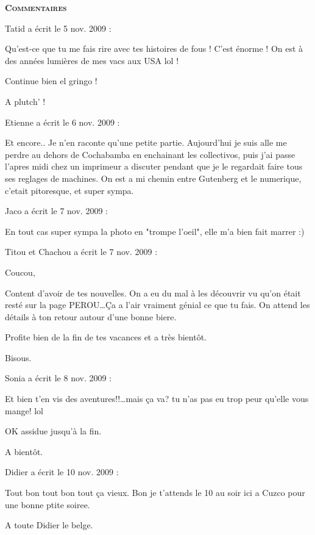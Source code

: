 \bigskip
\textbf{\textsc{Commentaires}}

\medskip
Tatid a écrit le 5 nov. 2009 :
\begin{displayquote}
Qu'est-ce que tu me fais rire avec tes histoires de fous ! C'est énorme ! On est à des années lumières de mes vacs aux USA lol !

Continue bien el gringo !

A plutch' !
\end{displayquote}

\medskip
Etienne a écrit le 6 nov. 2009 :
\begin{displayquote}
Et encore.. Je n'en raconte qu'une petite partie. Aujourd'hui je suis alle me perdre au dehors de Cochabamba en enchainant les collectivos, puis j'ai passe l'apres midi chez un imprimeur a discuter pendant que je le regardait faire tous ses reglages de machines. On est a mi chemin entre Gutenberg et le numerique, c'etait pitoresque, et super sympa.
\end{displayquote}

\medskip
Jaco a écrit le 7 nov. 2009 :
\begin{displayquote}
En tout cas super sympa la photo en "trompe l'oeil", elle m'a bien fait marrer :)
\end{displayquote}

\medskip
Titou et Chachou a écrit le 7 nov. 2009 :
\begin{displayquote}
Coucou,

Content d'avoir de tes nouvelles. On a eu du mal à les découvrir vu qu'on était resté sur la page PEROU\dots Ça a l'air vraiment génial ce que tu fais. On attend les détails à ton retour autour d'une bonne biere.

Profite bien de la fin de tes vacances et a très bientôt.

Bisous.
\end{displayquote}

\medskip
Sonia a écrit le 8 nov. 2009 :
\begin{displayquote}
Et bien t'en vis des aventures!!\dots mais ça va? tu n'as pas eu trop peur qu'elle vous mange! lol

OK assidue jusqu'à la fin.

A bientôt.
\end{displayquote}

\medskip
Didier a écrit le 10 nov. 2009 :
\begin{displayquote}
Tout bon tout bon tout ça vieux. Bon je t'attends le 10 au soir ici a Cuzco pour une bonne ptite soiree.

A toute
Didier le belge.
\end{displayquote}

